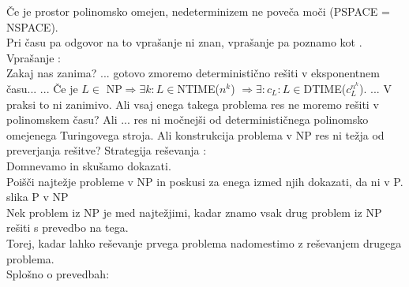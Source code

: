 \documentclass[10pt,a4paper,oneside]{book}
\begin{document}
\begin{neurejeno}
{{}
}
Če je prostor polinomsko omejen, nedeterminizem ne poveča moči (PSPACE = NSPACE).\\
Pri času pa odgovor na to vprašanje ni znan, vprašanje pa poznamo kot \PNP.
%
Vprašanje \PNP:\fixme\\
Zakaj nas zanima?
...
gotovo zmoremo deterministično rešiti v eksponentnem času...
...
Če je $L \in$ NP$\Rightarrow \exists k: L \in $NTIME($n^k$) $\Rightarrow \exists : c_L : L \in $DTIME($c_L^{n^k}$). ... V praksi to ni zanimivo.
Ali vsaj enega takega problema res ne moremo rešiti v polinomskem času?
Ali ... res ni močnejši od determinističnega polinomsko omejenega Turingovega stroja.
\br
Ali konstrukcija problema v NP res ni težja od preverjanja rešitve?
\br
Strategija reševanja \PNP:\\
Domnevamo \PniNP in skušamo dokazati.\\
Poišči najtežje probleme v NP in poskusi za enega izmed njih dokazati, da ni v P.\\
\fixme slika P v NP \\
Nek problem iz NP je med najtežjimi, kadar znamo vsak drug problem iz NP rešiti s prevedbo na tega.\\
Torej, kadar lahko reševanje prvega problema nadomestimo z reševanjem drugega problema.\\
Splošno o prevedbah:\\
\end{neurejeno}
\end{document}
